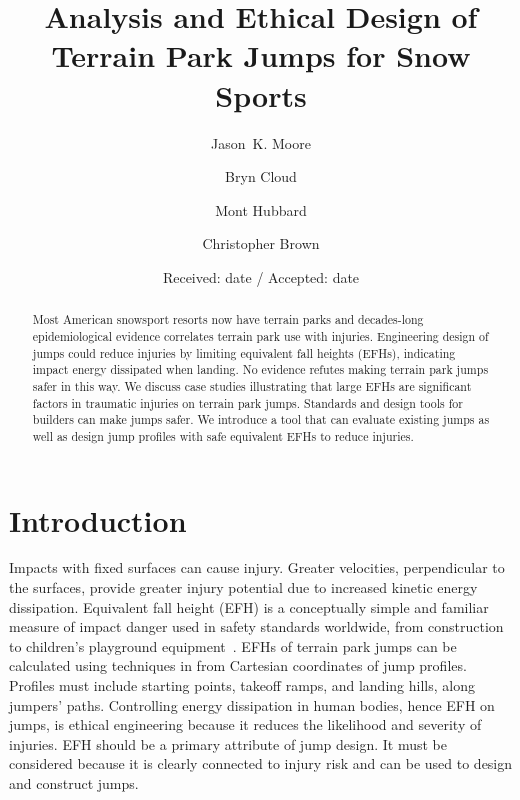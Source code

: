 \documentclass[smallextended]{svjour3}       %
\begin{document}
\title{Analysis and Ethical Design of Terrain Park Jumps for Snow Sports}

\author{
  Jason~K. Moore \and
  Bryn Cloud \and
  Mont Hubbard \and
  Christopher Brown
}


\date{Received: date / Accepted: date}

\maketitle

\begin{abstract}
  Most American snowsport resorts now have terrain parks and decades-long
  epidemiological evidence correlates terrain park use with injuries.
  Engineering design of jumps could reduce injuries by limiting equivalent fall
  heights (EFHs), indicating impact energy dissipated when landing. No evidence
  refutes making terrain park jumps safer in this way. We discuss case studies
  illustrating that large EFHs are significant factors in traumatic injuries on
  terrain park jumps. Standards and design tools for builders can make jumps
  safer. We introduce a tool that can evaluate existing jumps as well as design
  jump profiles with safe equivalent EFHs to reduce injuries.
\end{abstract}

\section{Introduction}
\label{intro}
%
Impacts with fixed surfaces can cause injury. Greater velocities, perpendicular
to the surfaces, provide greater injury potential due to increased kinetic
energy dissipation. Equivalent fall height (EFH) is a conceptually simple and
familiar measure of impact danger used in safety standards worldwide, from
construction~\cite{OSHA2021} to children's playground
equipment~\cite{Chalmers1996}. EFHs of terrain park jumps can be calculated
using techniques in \cite{Levy2015} from Cartesian coordinates of jump
profiles. Profiles must include starting points, takeoff ramps, and landing
hills, along jumpers' paths. Controlling energy dissipation in human bodies,
hence EFH on jumps, is ethical engineering because it reduces the likelihood
and severity of injuries. EFH should be a primary attribute of jump design. It
must be considered because it is clearly connected to injury risk and can be
used to design and construct jumps.
\end{document}
